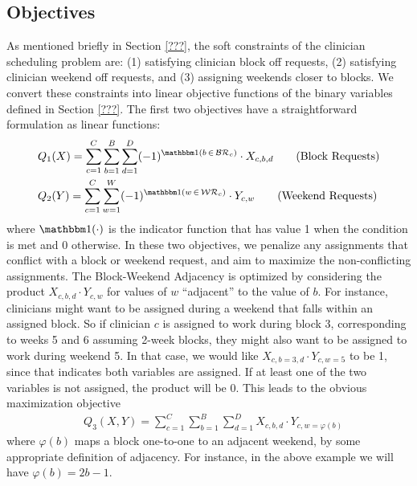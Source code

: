 \subsection{Objectives}
As mentioned briefly in Section \ref{???}, the soft constraints of the clinician scheduling problem are: (1) satisfying clinician block off requests, (2) satisfying clinician weekend off requests, and (3) assigning weekends closer to blocks. We convert these constraints into linear objective functions of the binary variables defined in Section \ref{???}. The first two objectives have a straightforward formulation as linear functions:
\begin{align}
	&Q_1(X) = \sum_{c=1}^{C} \sum_{b=1}^{B} \sum_{d=1}^{D} (-1)^{\ind(b\,\in\,\mathcal{BR}_c)}\cdot X_{c, b, d} \tag{Block Requests} \label{eqn:obj-block-requests}\\
	&Q_2(Y) = \sum_{c=1}^{C} \sum_{w=1}^{W} (-1)^{\ind(w\,\in\,\mathcal{WR}_c)}\cdot Y_{c, w} \tag{Weekend Requests} \label{eqn:obj-weekend-requests}
\end{align}
where $\ind(\cdot)$ is the indicator function that has value 1 when the condition is met and 0 otherwise. In these two objectives, we penalize any assignments that conflict with a block or weekend request, and aim to maximize the non-conflicting assignments. The Block-Weekend Adjacency is optimized by considering the product $X_{c, b, d}\cdot Y_{c, w}$ for values of $w$ ``adjacent'' to the value of $b$. For instance, clinicians might want to be assigned during a weekend that falls within an assigned block. So if clinician $c$ is assigned to work during block 3, corresponding to weeks 5 and 6 assuming 2-week blocks, they might also want to be assigned to work during weekend 5. In that case, we would like $X_{c, b=3, d} \cdot Y_{c, w=5}$ to be 1, since that indicates both variables are assigned. If at least one of the two variables is not assigned, the product will be 0. This leads to the obvious maximization objective
\begin{align}
	&Q_3(X, Y) = \sum_{c=1}^{C} \sum_{b=1}^{B} \sum_{d=1}^{D} X_{c, b, d}\cdot Y_{c, w=\varphi(b)} \tag{Block-Weekend Adjacency} \label{eqn:obj-block-weekend-adj}
\end{align}
where $\varphi(b)$ maps a block one-to-one to an adjacent weekend, by some appropriate definition of adjacency. For instance, in the above example we will have $\varphi(b) = 2b - 1$. \\

